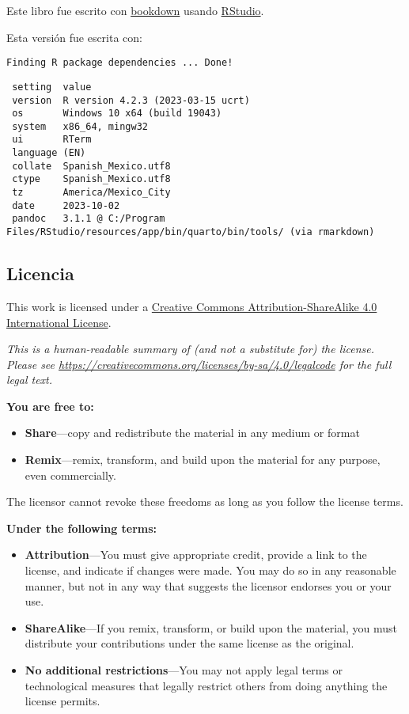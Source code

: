 \documentclass[
  a4paper,
  oneside,
  openany]{book}
\begin{document}
Este libro fue escrito con \href{http://bookdown.org/}{bookdown} usando \href{http://www.rstudio.com/ide/}{RStudio}.

Esta versión fue escrita con:

\begin{verbatim}
Finding R package dependencies ... Done!
\end{verbatim}

\begin{verbatim}
 setting  value
 version  R version 4.2.3 (2023-03-15 ucrt)
 os       Windows 10 x64 (build 19043)
 system   x86_64, mingw32
 ui       RTerm
 language (EN)
 collate  Spanish_Mexico.utf8
 ctype    Spanish_Mexico.utf8
 tz       America/Mexico_City
 date     2023-10-02
 pandoc   3.1.1 @ C:/Program Files/RStudio/resources/app/bin/quarto/bin/tools/ (via rmarkdown)
\end{verbatim}

\hypertarget{licencia}{%
\subsection*{Licencia}\label{licencia}}


This work is licensed under a \href{https://creativecommons.org/licenses/by-sa/4.0/}{Creative Commons Attribution-ShareAlike 4.0 International License}.

\emph{This is a human-readable summary of (and not a substitute for) the license.
Please see \url{https://creativecommons.org/licenses/by-sa/4.0/legalcode} for the full legal text.}

\textbf{You are free to:}

\begin{itemize}
\item
  \textbf{Share}---copy and redistribute the material in any medium or
  format
\item
  \textbf{Remix}---remix, transform, and build upon the material for any
  purpose, even commercially.
\end{itemize}

The licensor cannot revoke these freedoms as long as you follow the
license terms.

\textbf{Under the following terms:}

\begin{itemize}
\item
  \textbf{Attribution}---You must give appropriate credit, provide a link
  to the license, and indicate if changes were made. You may do so in
  any reasonable manner, but not in any way that suggests the licensor
  endorses you or your use.
\item
  \textbf{ShareAlike}---If you remix, transform, or build upon the material, you must distribute your contributions under the same license as the original.
\item
  \textbf{No additional restrictions}---You may not apply legal terms or
  technological measures that legally restrict others from doing
  anything the license permits.
\end{itemize}
\end{document}

